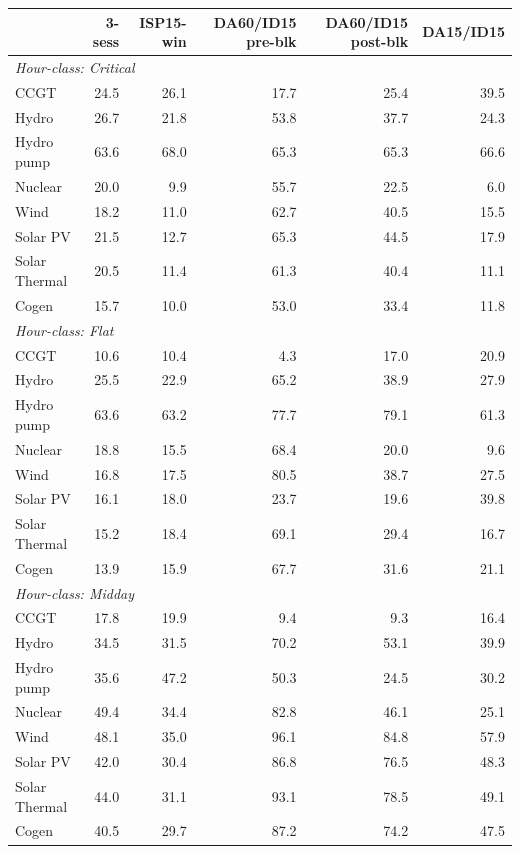 \begin{tabular}{l r r r r r}
\toprule
 & 3-sess & ISP15-win & DA60/ID15 pre-blk & DA60/ID15 post-blk & DA15/ID15 \\
\midrule
\multicolumn{6}{l}{\textit{Hour-class: Critical}} \\
CCGT & 24.5 & 26.1 & 17.7 & 25.4 & 39.5 \\
Hydro & 26.7 & 21.8 & 53.8 & 37.7 & 24.3 \\
Hydro pump & 63.6 & 68.0 & 65.3 & 65.3 & 66.6 \\
Nuclear & 20.0 & 9.9 & 55.7 & 22.5 & 6.0 \\
Wind & 18.2 & 11.0 & 62.7 & 40.5 & 15.5 \\
Solar PV & 21.5 & 12.7 & 65.3 & 44.5 & 17.9 \\
Solar Thermal & 20.5 & 11.4 & 61.3 & 40.4 & 11.1 \\
Cogen & 15.7 & 10.0 & 53.0 & 33.4 & 11.8 \\
\midrule
\multicolumn{6}{l}{\textit{Hour-class: Flat}} \\
CCGT & 10.6 & 10.4 & 4.3 & 17.0 & 20.9 \\
Hydro & 25.5 & 22.9 & 65.2 & 38.9 & 27.9 \\
Hydro pump & 63.6 & 63.2 & 77.7 & 79.1 & 61.3 \\
Nuclear & 18.8 & 15.5 & 68.4 & 20.0 & 9.6 \\
Wind & 16.8 & 17.5 & 80.5 & 38.7 & 27.5 \\
Solar PV & 16.1 & 18.0 & 23.7 & 19.6 & 39.8 \\
Solar Thermal & 15.2 & 18.4 & 69.1 & 29.4 & 16.7 \\
Cogen & 13.9 & 15.9 & 67.7 & 31.6 & 21.1 \\
\midrule
\multicolumn{6}{l}{\textit{Hour-class: Midday}} \\
CCGT & 17.8 & 19.9 & 9.4 & 9.3 & 16.4 \\
Hydro & 34.5 & 31.5 & 70.2 & 53.1 & 39.9 \\
Hydro pump & 35.6 & 47.2 & 50.3 & 24.5 & 30.2 \\
Nuclear & 49.4 & 34.4 & 82.8 & 46.1 & 25.1 \\
Wind & 48.1 & 35.0 & 96.1 & 84.8 & 57.9 \\
Solar PV & 42.0 & 30.4 & 86.8 & 76.5 & 48.3 \\
Solar Thermal & 44.0 & 31.1 & 93.1 & 78.5 & 49.1 \\
Cogen & 40.5 & 29.7 & 87.2 & 74.2 & 47.5 \\
\midrule
\bottomrule
\end{tabular}
